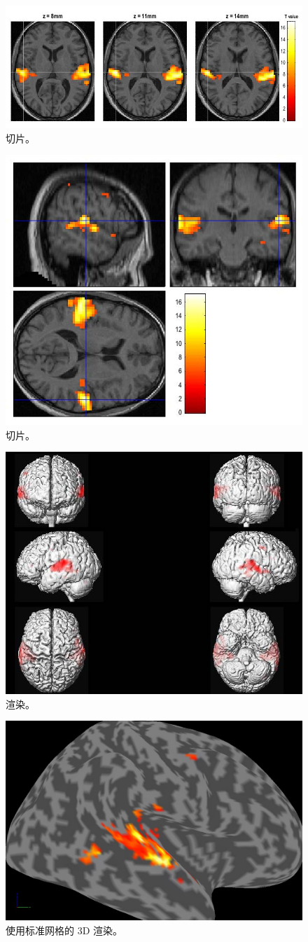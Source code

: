 \begin{figure}[htbp]
	\centering
	\includegraphics[width=0.6\linewidth]{part7/figs/fig_30_18}
	\caption{切片。}
	\label{fig_30_18}
\end{figure}

\begin{figure}[htbp]
	\centering
	\includegraphics[width=0.6\linewidth]{part7/figs/fig_30_19}
	\caption{切片。}
	\label{fig_30_19}
\end{figure}

\begin{figure}[htbp]
	\centering
	\includegraphics[width=0.6\linewidth]{part7/figs/fig_30_20}
	\caption{渲染。}
	\label{fig_30_20}
\end{figure}

\begin{figure}[htbp]
	\centering
	\includegraphics[width=0.6\linewidth]{part7/figs/fig_30_21}
	\caption{使用标准网格的 3D 渲染。}
	\label{fig_30_21}
\end{figure}


